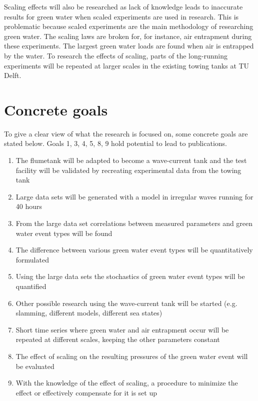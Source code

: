 Scaling effects will also be researched as lack of knowledge leads to inaccurate results for green water when scaled experiments are used in research. This is problematic because scaled experiments are the main methodology of researching green water. The scaling laws are broken for, for instance, air entrapment during
these experiments. The largest green water loads are found when air is entrapped by the water. To research the effects of scaling, parts of the long-running experiments will be repeated at larger scales in the existing
towing tanks at TU Delft.



\section{Concrete goals}
\label{sec:deliv_goals}
To give a clear view of what the research is focused on, some concrete goals are stated below. Goals 1, 3, 4, 5, 8, 9 hold potential to lead to publications.



\begin{enumerate}
	\item The flumetank will be adapted to become a wave-current tank and the test facility will be validated by recreating experimental data from the towing tank
	\item Large data sets will be generated with a model in irregular waves running for 40 hours
	\item From the large data set correlations between measured parameters and green water event types will be found
	\item The difference between various green water event types will be quantitatively formulated
	\item Using the large data sets the stochastics of green water event types will be quantified
	\item Other possible research using the wave-current tank will be started (e.g. slamming, different models, different sea states) 
	\item Short time series where green water and air entrapment occur will be repeated at different scales, keeping the other parameters constant
	\item The effect of scaling on the resulting pressures of the green water event will be evaluated
	\item With the knowledge of the effect of scaling, a procedure to minimize the effect or effectively compensate for it is set up
\end{enumerate}

